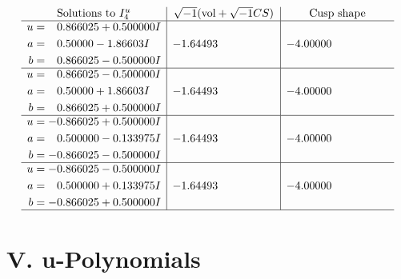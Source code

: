 \documentclass[1p]{elsarticle_modified}
\theoremstyle{definition}
\newcommand{\I}{\sqrt{-1}}
\begin{document}
$$\begin{array}{c|c|c}  
\text{Solutions to }I^u_{4}& \I (\text{vol} + \sqrt{-1}CS) & \text{Cusp shape}\\
 \hline 
\begin{aligned}
u &= \phantom{-}0.866025 + 0.500000 I \\
a &= \phantom{-}0.50000 - 1.86603 I \\
b &= \phantom{-}0.866025 - 0.500000 I\end{aligned}
 & -1.64493\phantom{ +0.000000I} & -4.00000\phantom{ +0.000000I} \\ \hline\begin{aligned}
u &= \phantom{-}0.866025 - 0.500000 I \\
a &= \phantom{-}0.50000 + 1.86603 I \\
b &= \phantom{-}0.866025 + 0.500000 I\end{aligned}
 & -1.64493\phantom{ +0.000000I} & -4.00000\phantom{ +0.000000I} \\ \hline\begin{aligned}
u &= -0.866025 + 0.500000 I \\
a &= \phantom{-}0.500000 - 0.133975 I \\
b &= -0.866025 - 0.500000 I\end{aligned}
 & -1.64493\phantom{ +0.000000I} & -4.00000\phantom{ +0.000000I} \\ \hline\begin{aligned}
u &= -0.866025 - 0.500000 I \\
a &= \phantom{-}0.500000 + 0.133975 I \\
b &= -0.866025 + 0.500000 I\end{aligned}
 & -1.64493\phantom{ +0.000000I} & -4.00000\phantom{ +0.000000I}\\
 \hline 
 \end{array}$$\newpage
\newpage\renewcommand{\arraystretch}{1}
\centering \section*{ V. u-Polynomials}
\end{document}
